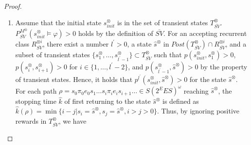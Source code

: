 \documentclass[10pt]{article}
\theoremstyle{definition}
\begin{document}
\begin{proof}
\begin{enumerate}
  \begin{align}
    V^{\bar{SV}}(s^{\otimes}_{init}) - V^{SV^{\ast}}(s^{\otimes}_{init})
     > & \frac{ \gamma^{\hat{K} - 1}}{ 1 - \gamma^{\hat{K} - 1}} r_p - ( m + \frac{1}{1-\gamma} ||\mathcal{R}_1||_{\infty} ) \nonumber \\
     = & ( \frac{ \gamma^{\hat{K} - 1}}{ 1 - \gamma^{\hat{K} - 1}} r_p - \frac{1}{1-\gamma} ||\mathcal{R}_1||_{\infty} ) - m, \nonumber
  \intertext{by the settings of $\gamma^{\ast}$ and $r^{\ast}_p$, we have}
    V^{\bar{SV}}(s^{\otimes}_{init}) - V^{SV^{\ast}}(s^{\otimes}_{init}) > & 0.
  \end{align}

  \item Assume that the initial state $s^{\otimes}_{init}$ is in the set of transient states $T_{\bar{SV}}^{\otimes}$.$P^{M^{\otimes}}_{\bar{SV}}(s^{\otimes}_{init} \models \varphi) > 0$ holds by the definition of $\bar{SV}$. For an accepting recurrent class $R^{\otimes i}_{\bar{SV}}$, there exist a number $l^{\prime} > 0$, a state $\hat{s}^{\otimes}$ in $Post(T^{\otimes}_{\bar{SV}}) \cap R^{\otimes i}_{\bar{SV}}$, and a subset of transient states $\{ s^{\otimes}_1, \ldots , s^{\otimes}_{l^{\prime}-1} \} \subset T^{\otimes}_{\bar{SV}}$ such that $p(s^{\otimes}_{init}, s^{\otimes}_1)>0$, $p(s^{\otimes}_{i}, s^{\otimes}_{i+1})>0$ for $i \in \{ 1,...,l^{\prime}-2 \}$, and $p(s^{\otimes}_{l^{\prime}-1}, \hat{s}^{\otimes})>0$ by the property of transient states.
    Hence, it holds that $p^{l^{\prime}}(s^{\otimes}_{init}, \hat{s}^{\otimes}) > 0$ for the state $\hat{s}^{\otimes}$. For each path $\rho = s_0 \pi_0 e_0 s_1 \ldots s_i \pi_i e_i s_{i+1} \ldots \in S (2^E E S)^{\omega}$ reaching $\hat{s}^{\otimes}$, the stopping time $\hat{k}$ of first returning to the state $\hat{s}^{\otimes}$ is defined as $\hat{k}(\rho) = \min \{ i - j | s_i = \hat{s}^{\otimes}, s_j = \hat{s}^{\otimes}, i>j>0 \}$. Thus, by ignoring positive rewards in $T^{\otimes}_{\bar{SV}}$, we have


\end{enumerate}
\end{proof}
\end{document}
